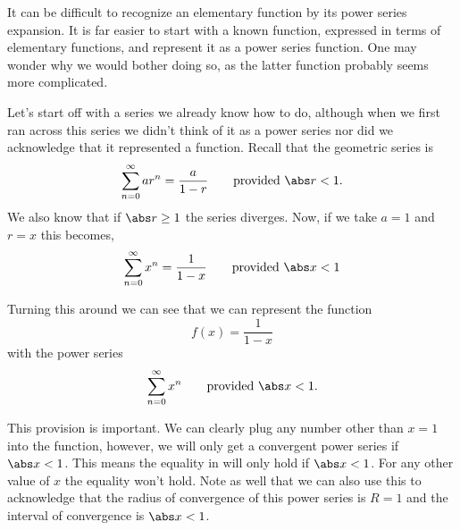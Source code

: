 It can be difficult to recognize an elementary function by its power series expansion. It is far easier to start with a known function, expressed in terms of elementary functions, and represent it as a power series function. One may wonder why we would bother doing so, as the latter function probably seems more complicated.


Let's start off with a series we already know how to do, although when we first ran across this series we didn't think of it as a power series nor did we acknowledge that it represented a function. Recall that the geometric series is
\[\sum_{n=0}^\infty ar^n = \frac a{1-r} \qquad \text{provided }\abs r<1.\]
We also know that if $\abs r\geq 1$ the series diverges. Now, if we take $a=1$ and $r=x$ this becomes,
\begin{equation}\label{eq_power_eq}
\sum_{n=0}^\infty x^n=\frac1{1-x}\qquad\text{provided }\abs x<1
\end{equation}

Turning this around we can see that we can represent the function
\begin{equation}\label{eq_power_func}
f(x) = \frac1{1-x}
\end{equation}
with the power series
\begin{equation}\label{eq_power_series}
\sum_{n=0}^{\infty}x^n \qquad \text{provided }\abs x<1.
\end{equation}

This provision is important.  We can clearly plug any number other than $x=1$ into the function, however, we will only get a convergent power series if $\abs x<1$.  This means the equality in  will only hold if $\abs x<1$.  For any other value of $x$ the equality won't hold.  Note as well that we can also use this to acknowledge that the radius of convergence of this power series is $R=1$ and the interval of convergence is $\abs x<1$.

